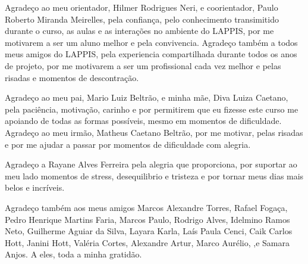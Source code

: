 \begin{agradecimentos}

    Agradeço ao meu orientador, Hilmer Rodrigues Neri, e coorientador, Paulo Roberto Miranda Meirelles, pela confiança, pelo conhecimento transimitido durante o curso, as aulas e as interações no ambiente do LAPPIS, por me motivarem a ser um aluno melhor e pela convivencia. Agradeço também a todos meus amigos do LAPPIS, pela experiencia compartilhada durante todos os anos de projeto, por me motivarem a ser um profissional cada vez melhor e pelas risadas e momentos de descontração.

    Agradeço ao meu pai, Mario Luiz Beltrão, e minha mãe, Diva Luiza Caetano, pela paciência, motivação, carinho e por permitirem que eu fizesse este curso me apoiando de todas as formas possíveis, mesmo em momentos de dificuldade. Agradeço ao meu irmão, Matheus Caetano Beltrão, por me motivar, pelas risadas e por me ajudar a passar por momentos de dificuldade com alegria.

    Agradeço a Rayane Alves Ferreira pela alegria que proporciona, por suportar ao meu lado momentos de stress, desequilibrio e tristeza e por tornar meus dias mais belos e incríveis.

    Agradeço também aos meus amigos Marcos Alexandre Torres, Rafael Fogaça, Pedro Henrique Martins Faria, Marcos Paulo, Rodrigo Alves, Idelmino Ramos Neto, Guilherme Aguiar da Silva, Layara Karla, Laís Paula Cenci, Caik Carlos Hott, Janini Hott, Valéria Cortes, Alexandre Artur, Marco Aurélio, ,e Samara Anjos. A eles, toda a minha gratidão.
\end{agradecimentos}
